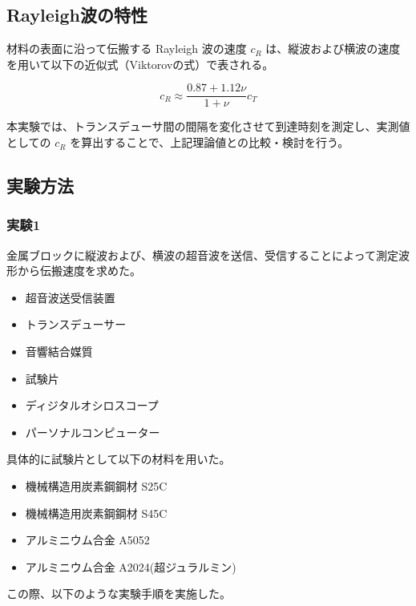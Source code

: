 \documentclass[uplatex,dvipdfmx,titlepage]{jsarticle}
\begin{document}
\subsection{Rayleigh波の特性}
材料の表面に沿って伝搬する Rayleigh 波の速度 $c_R$ は、縦波および横波の速度を用いて以下の近似式（Viktorovの式）で表される。

\begin{equation}
    c_R \approx \frac{0.87 + 1.12\nu}{1 + \nu} c_T
\end{equation}

本実験では、トランスデューサ間の間隔を変化させて到達時刻を測定し、実測値としての $c_R$ を算出することで、上記理論値との比較・検討を行う。
\subsection{実験方法}
\subsubsection*{実験1}
金属ブロックに縦波および、横波の超音波を送信、受信することによって測定波形から伝搬速度を求めた。
\begin{itemize}[nosep]
    \item 超音波送受信装置
    \item トランスデューサー
    \item 音響結合媒質
    \item 試験片
    \item ディジタルオシロスコープ
    \item パーソナルコンピューター
\end{itemize}
具体的に試験片として以下の材料を用いた。
\begin{itemize}[nosep]
    \item 機械構造用炭素鋼鋼材 S25C
    \item 機械構造用炭素鋼鋼材 S45C
    \item アルミニウム合金 A5052
    \item アルミニウム合金 A2024(超ジュラルミン)
\end{itemize}
この際、以下のような実験手順を実施した。
\end{document}
